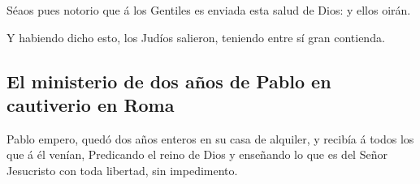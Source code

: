  Séaos pues notorio que á los Gentiles es enviada esta
salud de Dios: y ellos oirán.

 Y habiendo dicho esto, los Judíos salieron, teniendo
entre sí gran contienda.

\hypertarget{el-ministerio-de-dos-auxf1os-de-pablo-en-cautiverio-en-roma}{%
\subsection{El ministerio de dos años de Pablo en cautiverio en
Roma}\label{el-ministerio-de-dos-auxf1os-de-pablo-en-cautiverio-en-roma}}

 Pablo empero, quedó dos años enteros en su casa de
alquiler, y recibía á todos los que á él venían, 
Predicando el reino de Dios y enseñando lo que es del Señor Jesucristo
con toda libertad, sin impedimento.
